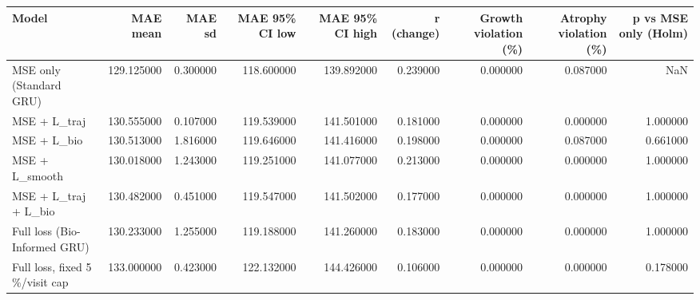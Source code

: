 \begin{tabular}{lrrrrrrrr}
\toprule
Model & MAE mean & MAE sd & MAE 95\% CI low & MAE 95\% CI high & r (change) & Growth violation (\%) & Atrophy violation (\%) & p vs MSE only (Holm) \\
\midrule
MSE only (Standard GRU) & 129.125000 & 0.300000 & 118.600000 & 139.892000 & 0.239000 & 0.000000 & 0.087000 & NaN \\
MSE + L\_traj & 130.555000 & 0.107000 & 119.539000 & 141.501000 & 0.181000 & 0.000000 & 0.000000 & 1.000000 \\
MSE + L\_bio & 130.513000 & 1.816000 & 119.646000 & 141.416000 & 0.198000 & 0.000000 & 0.087000 & 0.661000 \\
MSE + L\_smooth & 130.018000 & 1.243000 & 119.251000 & 141.077000 & 0.213000 & 0.000000 & 0.000000 & 1.000000 \\
MSE + L\_traj + L\_bio & 130.482000 & 0.451000 & 119.547000 & 141.502000 & 0.177000 & 0.000000 & 0.000000 & 1.000000 \\
Full loss (Bio-Informed GRU) & 130.233000 & 1.255000 & 119.188000 & 141.260000 & 0.183000 & 0.000000 & 0.000000 & 1.000000 \\
Full loss, fixed 5 \%/visit cap & 133.000000 & 0.423000 & 122.132000 & 144.426000 & 0.106000 & 0.000000 & 0.000000 & 0.178000 \\
\bottomrule
\end{tabular}
